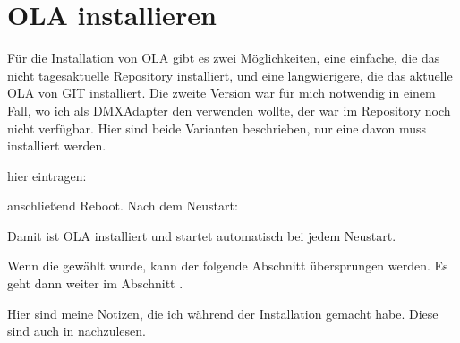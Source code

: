 \documentclass[letterpaper,10pt,ngerman]{sphinxmanual}
\begin{document}
\section{OLA installieren}
\label{\detokenize{raspberry:ola-installieren}}
Für die Installation von OLA gibt es zwei Möglichkeiten, eine einfache, die das
nicht tagesaktuelle Repository installiert, und eine langwierigere, die das
aktuelle OLA von GIT installiert. Die zweite Version war für mich notwendig in
einem Fall, wo ich als DMX\sphinxhyphen{}Adapter den  verwenden
wollte, der war im Repository noch nicht verfügbar. Hier sind beide
Varianten beschrieben, nur eine davon muss installiert werden.



hier eintragen:

\begin{sphinxVerbatim}[commandchars=\\\{\}]
   
\end{sphinxVerbatim}

anschließend Reboot.
Nach dem Neustart:


Damit ist OLA installiert und startet automatisch bei jedem Neustart.


Wenn die  gewählt wurde, kann der folgende Abschnitt
übersprungen werden. Es geht dann weiter im Abschnitt .

Hier sind meine Notizen, die ich während der Installation gemacht habe. Diese
sind auch in
 nachzulesen.
\end{document}
